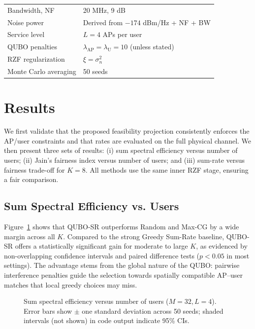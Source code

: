 {\begin{table}[htbp]
\begin{tabular}{@{}ll@{}}
Bandwidth, NF & 20 MHz, 9 dB \\
Noise power & Derived from $-174$ dBm/Hz + NF + BW \\
Service level & $L=4$ APs per user \\
QUBO penalties & $\lambda_{\text{AP}}=\lambda_{\text{U}}=10$ (unless stated) \\
RZF regularization & $\xi=\sigma_n^2$ \\
Monte Carlo averaging & 50 seeds \\
\bottomrule
\end{tabular}
\end{table}

\section{Results}
We first validate that the proposed feasibility projection consistently enforces the AP/user constraints and that rates are evaluated on the full physical channel. We then present three sets of results: (i) sum spectral efficiency versus number of users; (ii) Jain’s fairness index versus number of users; and (iii) sum-rate versus fairness trade-off for $K=8$. All methods use the same inner RZF stage, ensuring a fair comparison.

\subsection{Sum Spectral Efficiency vs. Users}
Figure~\ref{fig:sum_rate} shows that QUBO-SR outperforms Random and Max-CG by a wide margin across all $K$. Compared to the strong Greedy Sum-Rate baseline, QUBO-SR offers a statistically significant gain for moderate to large $K$, as evidenced by non-overlapping confidence intervals and paired difference tests ($p<0.05$ in most settings). The advantage stems from the global nature of the QUBO: pairwise interference penalties guide the selection towards spatially compatible AP–user matches that local greedy choices may miss.

\begin{figure}[htbp]
\centering
{}
\caption{Sum spectral efficiency versus number of users ($M=32, L=4$). Error bars show $\pm$ one standard deviation across 50 seeds; shaded intervals (not shown) in code output indicate 95\% CIs.}
\label{fig:sum_rate}
\end{figure}

}
